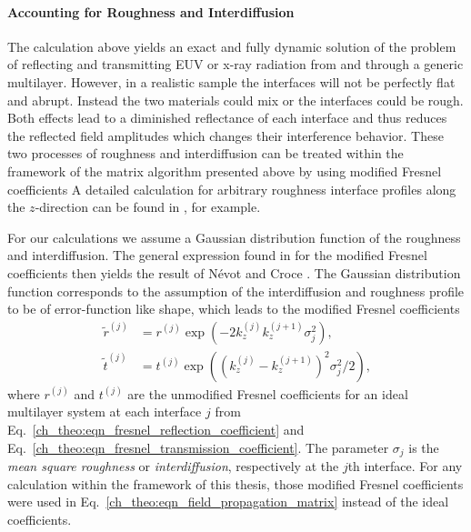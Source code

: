 \paragraph{Accounting for Roughness and Interdiffusion}
The calculation above yields an exact and fully dynamic solution of the problem of reflecting and transmitting EUV or x-ray radiation from and through a generic multilayer. However, in a realistic sample the interfaces will not be perfectly flat and abrupt. Instead the two materials could mix or the interfaces could be rough. Both effects lead to a diminished reflectance of each interface and thus reduces the reflected field amplitudes which changes their interference behavior. These two processes of roughness and interdiffusion can be treated within the framework of the matrix algorithm presented above by using modified Fresnel coefficients A detailed calculation for arbitrary roughness interface profiles along the $z$-direction can be found in \cite{vidal_metallic_1984}, for example.

For our calculations we assume a Gaussian distribution function of the roughness and interdiffusion. The general expression found in \cite{vidal_metallic_1984} for the modified Fresnel coefficients then yields the result of N\'{e}vot and Croce \cite{croce_p._etude_1976, nevot_l._caracterisation_1980}. The Gaussian distribution function corresponds to the assumption of the interdiffusion and roughness profile to be of error-function like shape, which leads to the modified Fresnel coefficients
\begin{align}
       \tilde{r}^{(j)} &= r^{(j)} \exp(-2 k_z^{(j)} k_z^{(j+1)} 
\sigma_j^2)\text{,} \nonumber \\
       \tilde{t}^{(j)} &= t^{(j)} \exp((k_z^{(j)} - k_z^{(j+1)})^2 \sigma_j^2/2) 
\text{,} \label{eqn:mod_fresnel}
\end{align}
where $r^{(j)}$ and $t^{(j)}$ are the unmodified Fresnel coefficients for an ideal multilayer system at each interface $j$ from Eq.~\eqref{ch_theo:eqn_fresnel_reflection_coefficient} and Eq.~\eqref{ch_theo:eqn_fresnel_transmission_coefficient}. The parameter $\sigma_j$ is the \emph{mean square roughness} or \emph{interdiffusion}, respectively at the $j$th interface. For any calculation within the framework of this thesis, those modified Fresnel coefficients were used in Eq.~\eqref{ch_theo:eqn_field_propagation_matrix} instead of the ideal coefficients.



